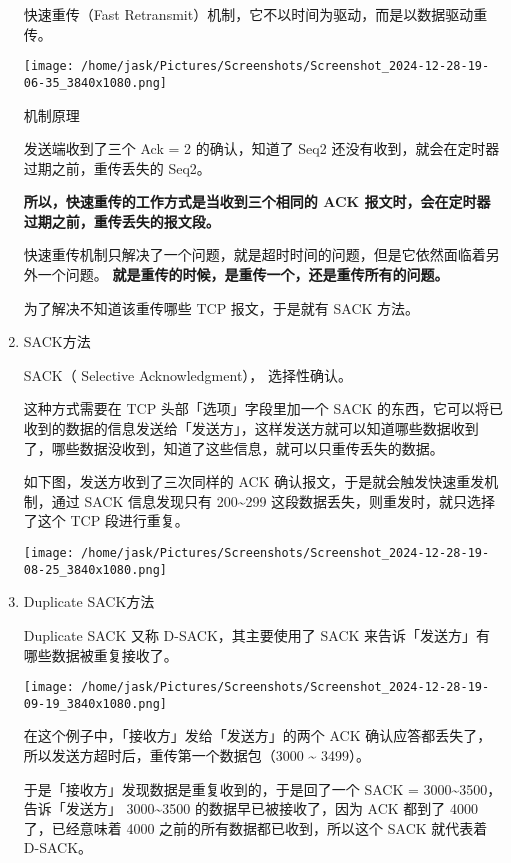 \documentclass[11pt]{article}
\begin{document}
\begin{enumerate}
快速重传（Fast Retransmit）机制，它不以时间为驱动，而是以数据驱动重传。

\begin{center}
\texttt{[image: /home/jask/Pictures/Screenshots/Screenshot\_2024-12-28-19-06-35\_3840x1080.png]}
\end{center}
机制原理

发送端收到了三个 Ack = 2 的确认，知道了 Seq2 还没有收到，就会在定时器过期之前，重传丢失的 Seq2。

\textbf{所以，快速重传的工作方式是当收到三个相同的 ACK 报文时，会在定时器过期之前，重传丢失的报文段。}

快速重传机制只解决了一个问题，就是超时时间的问题，但是它依然面临着另外一个问题。 \textbf{就是重传的时候，是重传一个，还是重传所有的问题。}

为了解决不知道该重传哪些 TCP 报文，于是就有 SACK 方法。
\item SACK方法
\label{sec:orgec19abc}

SACK（ Selective Acknowledgment）， 选择性确认。

这种方式需要在 TCP 头部「选项」字段里加一个 SACK 的东西，它可以将已收到的数据的信息发送给「发送方」，这样发送方就可以知道哪些数据收到了，哪些数据没收到，知道了这些信息，就可以只重传丢失的数据。

如下图，发送方收到了三次同样的 ACK 确认报文，于是就会触发快速重发机制，通过 SACK 信息发现只有 200\textasciitilde{}299 这段数据丢失，则重发时，就只选择了这个 TCP 段进行重复。
\begin{center}
\texttt{[image: /home/jask/Pictures/Screenshots/Screenshot\_2024-12-28-19-08-25\_3840x1080.png]}
\end{center}
\item Duplicate SACK方法
\label{sec:orgb9faaf3}

Duplicate SACK 又称 D-SACK，其主要使用了 SACK 来告诉「发送方」有哪些数据被重复接收了。

\begin{center}
\texttt{[image: /home/jask/Pictures/Screenshots/Screenshot\_2024-12-28-19-09-19\_3840x1080.png]}
\end{center}

在这个例子中，「接收方」发给「发送方」的两个 ACK 确认应答都丢失了，所以发送方超时后，重传第一个数据包（3000 \textasciitilde{} 3499）。

于是「接收方」发现数据是重复收到的，于是回了一个 SACK = 3000\textasciitilde{}3500，告诉「发送方」 3000\textasciitilde{}3500 的数据早已被接收了，因为 ACK 都到了 4000 了，已经意味着 4000 之前的所有数据都已收到，所以这个 SACK 就代表着 D-SACK。


\end{enumerate}
\end{document}
